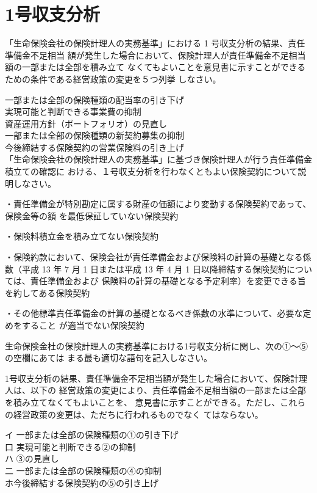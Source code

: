 \documentclass[report,gutter=10mm,fore-edge=10mm,uplatex,dvipdfmx]{jlreq}
\begin{document}
\section{1号収支分析}
「生命保険会社の保険計理人の実務基準」における 1 号収支分析の結果、責任準備金不足相当
額が発生した場合において、保険計理人が責任準備金不足相当額の一部または全部を積み立て
なくてもよいことを意見書に示すことができるための条件である経営政策の変更を５つ列挙
しなさい。

\answer{}
一部または全部の保険種類の配当率の引き下げ\\
実現可能と判断できる事業費の抑制\\
資産運用方針（ポートフォリオ）の見直し\\
一部または全部の保険種類の新契約募集の抑制\\
今後締結する保険契約の営業保険料の引き上げ\\

「生命保険会社の保険計理人の実務基準」に基づき保険計理人が行う責任準備金積立ての確認に
おける、１号収支分析を行わなくともよい保険契約について説明しなさい。

\answer{}

・責任準備金が特別勘定に属する財産の価額により変動する保険契約であって、保険金等の額
を最低保証していない保険契約

・保険料積立金を積み立てない保険契約

・保険約款において、保険会社が責任準備金および保険料の計算の基礎となる係数（平成 13
年 7 月 1 日または平成 13 年 4 月 1 日以降締結する保険契約については、責任準備金および
保険料の計算の基礎となる予定利率）を変更できる旨を約してある保険契約

・その他標準責任準備金の計算の基礎となるべき係数の水準について、必要な定めをすること
が適当でない保険契約

生命保険金杜の保険計理人の実務基準における1号収支分析に関し、次の①〜⑤の空欄にあては
まる最も適切な語句を記入しなさい。

1号収支分析の結果、責任準備金不足相当額が発生した場合において、保険計理人は、以下の
経営政策の変更により、責任準備金不足相当額の一部または全部を積み立てなくてもよいことを、
意見書に示すことができる。ただし、これらの経営政策の変更は、ただちに行われるものでなく
てはならない。

イ 一部または全部の保険種類の①の引き下げ\\
口 実現可能と判断できる②の抑制\\
ハ ③の見直し\\
二 一部または全部の保険種類の④の抑制\\
ホ今後締結する保険契約の⑤の引き上げ\\
\end{document}
